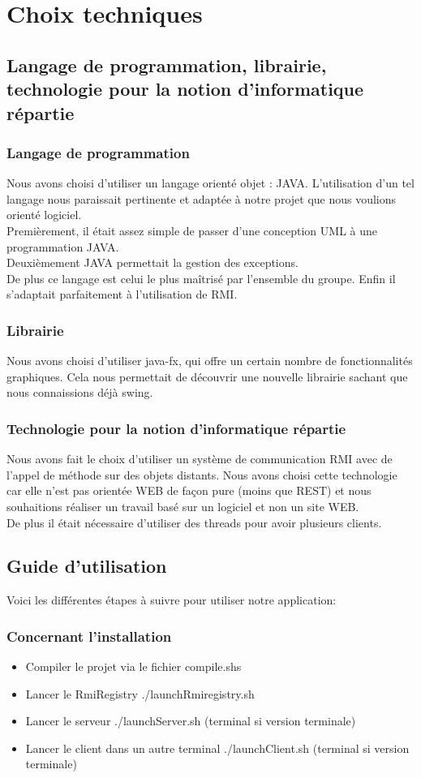 \documentclass[11pt,dvipsnames,svgnames]{report}
\begin{document}
\section{Choix techniques}
\subsection{Langage de programmation, librairie, technologie pour la notion d'informatique répartie}
\subsubsection{Langage de programmation}
Nous avons choisi d'utiliser un langage orienté objet : JAVA. L'utilisation d'un tel langage nous paraissait pertinente et adaptée à notre projet que nous voulions orienté logiciel.\\
Premièrement, il était assez simple de passer d'une conception UML à une programmation JAVA. \\
Deuxièmement JAVA permettait la gestion des exceptions.\\
De plus ce langage est celui le plus maîtrisé par l'ensemble du groupe.
Enfin il s'adaptait parfaitement à l'utilisation de RMI.\\
\subsubsection{Librairie}
Nous avons choisi d'utiliser java-fx, qui offre un certain nombre de fonctionnalités graphiques. Cela nous permettait de découvrir une nouvelle librairie sachant que nous connaissions déjà swing.
\subsubsection{Technologie pour la notion d'informatique répartie}
Nous avons fait le choix d'utiliser un système de communication RMI avec de l'appel de méthode sur des objets distants. Nous avons choisi cette technologie car elle n'est pas orientée WEB de façon pure (moins que REST) et nous souhaitions réaliser un travail basé sur un logiciel et non un site WEB.\\
De plus il était nécessaire d'utiliser des threads pour avoir plusieurs clients. 
\subsection{Guide d'utilisation}
Voici les différentes étapes à suivre pour utiliser notre application:
\subsubsection{Concernant l'installation}
\begin{itemize}
\item Compiler le projet via le fichier compile.shs
\item Lancer le RmiRegistry ./launchRmiregistry.sh
\item Lancer le serveur ./launchServer.sh (terminal si version terminale)
\item Lancer le client dans un autre terminal ./launchClient.sh (terminal si version terminale)
\end{itemize}
\end{document}
